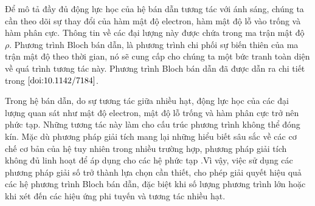 \documentclass[%
 reprint,
 amsmath,amssymb,
 aps,
]{revtex4-2}
\begin{document}
Để mô tả đầy đủ động lực học của hệ bán dẫn tương tác với ánh sáng, chúng ta cần theo dõi sự thay đổi của hàm mật độ electron, hàm mật độ lỗ vào trống và hàm phân cực. Thông tin về các đại lượng này được chứa trong ma trận mật độ $\rho$. Phương trình Bloch bán dẫn, là phương trình chi phối sự biến thiên của ma trận mật độ theo thời gian, nó sẽ cung cấp cho chúng ta một bức tranh toàn diện về quá trình tương tác này. Phương trình Bloch bán dẫn đã được dẫn ra chi tiết trong ${\cite{doi:10.1142/7184}}\relax$.

Trong hệ bán dẫn, do sự tương tác giữa nhiều hạt, động lực học của các đại lượng quan sát như mật độ electron, mật độ lỗ trống và hàm phân cực trở nên phức tạp. Những tương tác này làm cho cấu trúc phương trình không thể đóng kín. Mặc dù phương pháp giải tích mang lại những hiểu biết sâu sắc về các cơ chế cơ bản của hệ tuy nhiên trong nhiều trường hợp, phương pháp giải tích không đủ linh hoạt để áp dụng cho các hệ phức tạp .Vì vậy, việc sử dụng các phương pháp giải số trở thành lựa chọn cần thiết, cho phép giải quyết hiệu quả các hệ phương trình Bloch bán dẫn, đặc biệt khi số lượng phương trình lớn hoặc khi xét đến các hiệu ứng phi tuyến và tương tác nhiều hạt.
\end{document}
